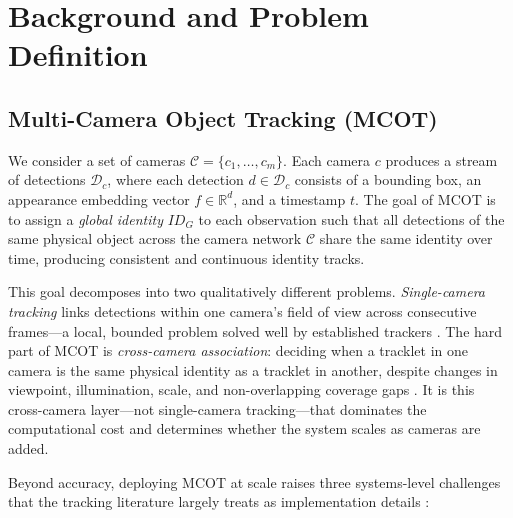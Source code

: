 \documentclass[review]{elsarticle}
\begin{document}
\section{Background and Problem Definition}\label{sec:background}

\subsection{Multi-Camera Object Tracking (MCOT)}
\label{sec:background:mcot}

We consider a set of cameras $\mathcal{C} = \{c_1,\dots,c_m\}$. Each camera $c$ produces a stream of detections $\mathcal{D}_c$, where each detection $d \in \mathcal{D}_c$ consists of a bounding box, an appearance embedding vector $f \in \mathbb{R}^{d}$, and a timestamp $t$. The goal of MCOT is to assign a \emph{global identity} $ID_G$ to each observation such that all detections of the same physical object across the camera network $\mathcal{C}$ share the same identity over time, producing consistent and continuous identity tracks.

This goal decomposes into two qualitatively different problems. \emph{Single-camera tracking} links detections within one camera's field of view across consecutive frames---a local, bounded problem solved well by established trackers
. The hard part of MCOT is \emph{cross-camera association}: deciding when a tracklet in one camera is the same physical identity as a tracklet in another, despite changes in viewpoint, illumination, scale, and non-overlapping coverage gaps . It is this cross-camera layer---not single-camera tracking---that dominates the computational cost and determines whether the system scales as cameras are added.

Beyond accuracy, deploying MCOT at scale raises three systems-level challenges that the
tracking literature largely treats as implementation details
:
\end{document}
